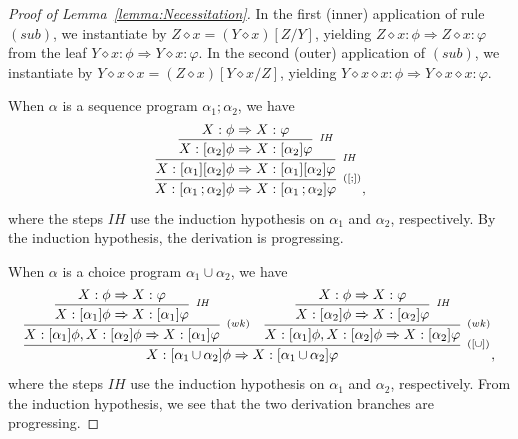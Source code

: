 \documentclass[manuscript,screen]{acmart}
\DeclareMathOperator{\seq}{;}
\DeclareMathOperator{\cho}{\cup}
\newcommand{\Sub}[0]{{\textit{sub}}}
\newcommand{\cat}[0]{\diamond}
\begin{document}
\begin{proof}[Proof of Lemma~\ref{lemma:Necessitation}]
\ifx
In the first (inner) application of rule $(\Sub)$, we instantiate by $Z\cat x = (Y\cat x)[Z/Y]$, yielding $Z\cat x : \phi\Rightarrow Z\cat x : \varphi$ from the leaf $Y\cat x : \phi\Rightarrow Y\cat x : \varphi$.  In the second (outer) application of $(\Sub)$, we instantiate by $Y\cat x\cat x = (Z\cat x)[Y\cat x/Z]$, yielding $Y\cat x\cat x : \phi\Rightarrow Y\cat x\cat x : \varphi$. 
\fi

When $\alpha$ is a sequence program $\alpha_1\seq\alpha_2$, we have
$$
\infer[^{([\seq])}]
{X:[\alpha_1\seq\alpha_2]\phi\Rightarrow X:[\alpha_1\seq\alpha_2]\varphi}
{
    \infer[^{\textit{IH}}]
    {X:[\alpha_1][\alpha_2]\phi\Rightarrow X:[\alpha_1][\alpha_2]\varphi}
    {
        \infer[^{\textit{IH}}]
        {X:[\alpha_2]\phi\Rightarrow X:[\alpha_2]\varphi}
        {
            X:\phi\Rightarrow X:\varphi
        }
    }
}, 
$$
where the steps $\textit{IH}$ use the induction hypothesis on $\alpha_1$ and $\alpha_2$, respectively. 
By the induction hypothesis, the derivation is progressing. 

When $\alpha$ is a choice program $\alpha_1\cho\alpha_2$, we have
$$
\infer[^{([\cup])}]
{X:[\alpha_1\cho\alpha_2]\phi\Rightarrow X:[\alpha_1\cho\alpha_2]\varphi}
{
    \infer[^{(wk)}]
    {X:[\alpha_1]\phi, X:[\alpha_2]\phi\Rightarrow X:[\alpha_1]\varphi}
    {
        \infer[^{\textit{IH}}]
        {X:[\alpha_1]\phi\Rightarrow X:[\alpha_1]\varphi}
        {
            X:\phi\Rightarrow X:\varphi
        }
    }
    &
    \infer[^{(wk)}]
    {X:[\alpha_1]\phi, X:[\alpha_2]\phi\Rightarrow X:[\alpha_2]\varphi}
    {
        \infer[^{\textit{IH}}]
        {X:[\alpha_2]\phi\Rightarrow X:[\alpha_2]\varphi}
        {
            X:\phi\Rightarrow X:\varphi
        }
    }
},
$$
where the steps $\textit{IH}$ use the induction hypothesis on $\alpha_1$ and $\alpha_2$, respectively. 
From the induction hypothesis, we see that the two derivation branches are progressing. 


\end{proof}
\end{document}
